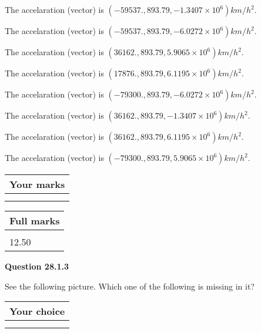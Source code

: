 \documentclass[12pt]{article}
\begin{document}
 
The accelaration (vector) is
$(
-59537.,
893.79 ,
-1.3407 \times 10^{6}
)km/h^2.
$
 
 
The accelaration (vector) is
$(
-59537.,
893.79 ,
-6.0272 \times 10^{6}
)km/h^2.
$
 
 
The accelaration (vector) is
$(
36162.,
893.79 ,
5.9065 \times 10^{6}
)km/h^2.
$
 
 
The accelaration (vector) is
$(
17876.,
893.79 ,
6.1195 \times 10^{6}
)km/h^2.
$
 
 
The accelaration (vector) is
$(
-79300.,
893.79 ,
-6.0272 \times 10^{6}
)km/h^2.
$
 
 
The accelaration (vector) is
$(
36162.,
893.79 ,
-1.3407 \times 10^{6}
)km/h^2.
$
 
 
The accelaration (vector) is
$(
36162.,
893.79 ,
6.1195 \times 10^{6}
)km/h^2.
$
 
 
The accelaration (vector) is
$(
-79300.,
893.79 ,
5.9065 \times 10^{6}
)km/h^2.
$
 
 
 
 

 
 
\vspace{0.3in}
  
\vspace{0.2in}
  
         \begin{tabular}{|l|}
\hline
 Your marks  \\
\hline
 \\ 
 \\ 
\hline
\end{tabular}
\hspace{0.05in} \begin{tabular}{|l|}
\hline
 Full marks  \\
\hline
 \\ 
12.50 \\
\hline
\end{tabular}
{\textbf{\Large{Question
28.1.3 
}}}
  
  
See the following picture.
Which one of the following is missing in it?
  
  
\noindent\hspace{3.0in} \begin{tabular}{|l|}
\hline
Your choice \\
\hline
 \\ 
 \\ 
\hline
\end{tabular}
  
\end{document}
